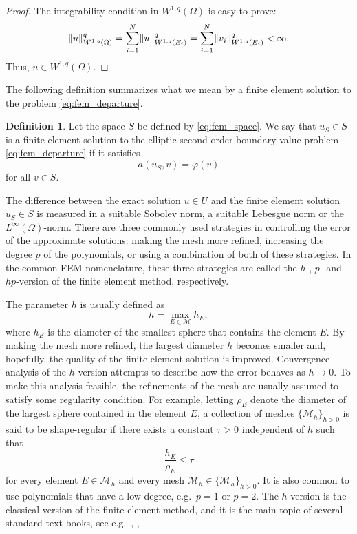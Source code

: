 \documentclass[english, 12pt, a4paper, sci, utf8, a-2b, online]{aaltothesis}
\theoremstyle{definition}
\newtheorem{definition}{Definition}[section]
\theoremstyle{plain}
\DeclarePairedDelimiter\norm{\lVert}{\rVert}
\numberwithin{equation}{section}
\begin{document}
\begin{proof}
    The integrability condition in $W^{1,q}(\Omega)$ is easy to prove:
    \begin{equation*}
        \norm{u}_{W^{1,q}(\Omega)}^q
        = \sum_{i=1}^{N} \norm{u}_{W^{1,q}(E_i)}^q
        = \sum_{i=1}^{N} \norm{v_i}_{W^{1,q}(E_i)}^q
        < \infty.
    \end{equation*}
    Thus, $u \in W^{1,q}(\Omega)$.
\end{proof}

The following definition summarizes what we mean by a finite element
solution to the problem \eqref{eq:fem_departure}.
\begin{definition}
    \label{def:fem_solution}
    Let the space $S$ be defined by \eqref{eq:fem_space}.
    We say that $u_S \in S$ is a finite element solution to the
    elliptic second-order boundary value problem \eqref{eq:fem_departure}
    if it satisfies
    \begin{equation*}
        a(u_S,v) = \varphi(v)
    \end{equation*}
    for all $v \in S$.
\end{definition}

The difference between the exact solution $u \in U$
and the finite element solution $u_S \in S$ is measured
in a suitable Sobolev norm, a suitable Lebesgue norm
or the $L^{\infty}(\Omega)$-norm.
There are three commonly used strategies in controlling the error
of the approximate solutions: making the mesh more refined,
increasing the degree $p$ of the polynomials,
or using a combination of both of these strategies.
In the common FEM nomenclature,
these three strategies are called the $h$-, $p$- and $hp$-version
of the finite element method, respectively.

The parameter $h$ is usually defined as
\begin{equation*}
    h = \max_{E \in \mathcal{M}} h_E,
\end{equation*}
where $h_E$ is the diameter of the smallest sphere that contains the element $E$.
By making the mesh more refined, the largest diameter $h$
becomes smaller and, hopefully, the quality of the finite element solution
is improved. Convergence analysis of the $h$-version attempts to
describe how the error behaves as $h \to 0$.
To make this analysis feasible, the refinements of the mesh are usually
assumed to satisfy some regularity condition. For example, letting
$\rho_E$ denote the diameter of the largest sphere contained in the element $E$,
a collection of meshes $\{ \mathcal{M}_h \}_{h > 0}$
is said to be shape-regular if there exists
a constant $\tau > 0$ independent of $h$ such that
\begin{equation*}
    \frac{h_E}{\rho_E} \leq \tau
\end{equation*}
for every element $E \in \mathcal{M}_h$
and every mesh $\mathcal{M}_h \in \{ \mathcal{M}_h \}_{h > 0}$.
It is also common to use polynomials that have a low degree, e.g.\ $p=1$ or $p=2$.
The $h$-version is the classical version of the finite element method,
and it is the main topic of several standard text books,
see e.g.\ \cite{ciarlet2002}, \cite{braess2007}, \cite{scottbrenner2007}.
\end{document}
